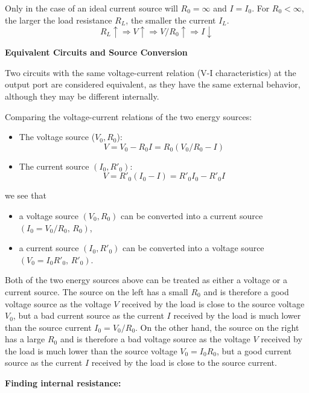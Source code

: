 \begin{itemize}
Only in the case of an ideal current source will $R_0=\infty$ and $I=I_0$. 
For $R_0<\infty$, the larger the load resistance $R_L$, the smaller the 
current $I_L$.
\[
R_L \uparrow \Longrightarrow V \uparrow \Longrightarrow V/R_0 \uparrow
\Longrightarrow I \downarrow 
\]

{\bf Equivalent Circuits and Source Conversion}

Two circuits with the same voltage-current relation (V-I characteristics)
at the output port are considered equivalent, as they have the same 
external behavior, although they may be different internally.


Comparing the voltage-current relations of the two energy sources:
\begin{itemize} 
\item The voltage source ($V_0, R_0$):
  \[ V=V_0-R_0I=R_0(V_0/R_0-I) \]
\item The current source $(I_0, R'_0)$:
  \[ V=R'_0(I_0-I)=R'_0I_0-R'_0I \]
\end{itemize} 
we see that 
\begin{itemize}
\item a voltage source $(V_0, R_0)$ can be converted into a current
  source $(I_0=V_0/R_0,\,R_0)$,
\item a current source $(I_0, R'_0)$ can be converted into a voltage
  source $(V_0=I_0R'_0,\,R'_0)$.
\end{itemize}


Both of the two energy sources above can be treated as either a voltage 
or a current source. The source on the left has a small $R_0$ and is 
therefore a good voltage source as the voltage $V$ received by the load
is close to the source voltage $V_0$, but a bad current source as the 
current $I$ received by the load is much lower than the source current 
$I_0=V_0/R_0$. On the other hand, the source on the right has a large
$R_0$ and is therefore a bad voltage source as the voltage $V$ received 
by the load is much lower than the source voltage $V_0=I_0R_0$, but a 
good current source as the current $I$ received by the load is close to 
the source current.


{\bf Finding internal resistance:}


\end{itemize}
